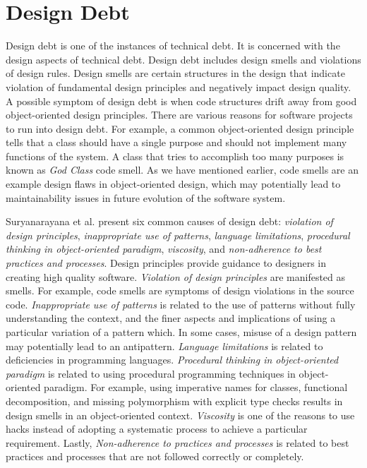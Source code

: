 

\section{Design Debt}
\label{sec:designdebt}
Design debt is one of the instances of technical debt\cite{li2015systematic,Zazworka:2011:PDD:1985362.1985372,foser076-brown}. It is concerned with the design aspects of technical debt. Design debt includes design smells and violations of design rules. Design smells are certain structures in the design that indicate violation of fundamental design principles and negatively impact design quality\cite{suryanarayana2014refactoring}. A possible symptom of design debt is when code structures drift away from good object-oriented design principles\cite{zazworka2011investigating}. There are various reasons for software projects to run into design debt. For example, a common object-oriented design principle tells that a class should have a single purpose and should not implement many functions of the system. A class that tries to accomplish too many purposes is known as \textit{God Class} code smell. As we have mentioned earlier, code smells are an example design flaws in object-oriented design, which may potentially lead to maintainability issues in future evolution of the software system\cite{olbrich2009evolution}.

Suryanarayana et al.\cite{suryanarayana2014refactoring} present six common causes of design debt: \textit{violation of design principles}, \textit{inappropriate use of patterns}, \textit{language limitations}, \textit{procedural thinking in object-oriented paradigm}, \textit{viscosity}, and \textit{non-adherence to best practices and processes}. Design principles provide guidance to designers in creating high quality software. \textit{Violation of design principles} are manifested as smells. For example, code smells are symptoms of design violations in the source code. \textit{Inappropriate use of patterns} is related to the use of patterns without fully understanding the context, and the finer aspects and implications of using a particular variation of a pattern which. In some cases, misuse of a design pattern may potentially lead to an antipattern. \textit{Language limitations} is related to deficiencies in programming languages. \textit{Procedural thinking in object-oriented paradigm} is related to using procedural programming techniques in object-oriented paradigm. For example, using imperative names for classes, functional decomposition, and missing polymorphism with explicit type checks results in design smells in an object-oriented context. \textit{Viscosity} is one of the reasons to use hacks instead of adopting a systematic process to achieve a particular requirement. Lastly, \textit{Non-adherence to practices and processes} is related to best practices and processes that are not followed correctly or completely. 




